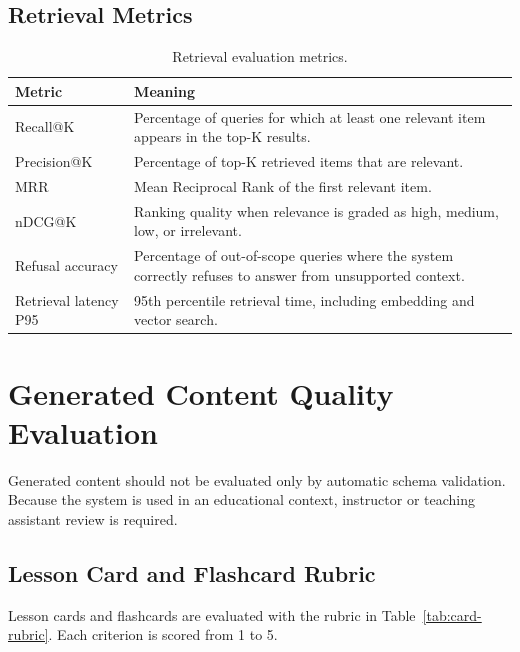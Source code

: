 \subsection{Retrieval Metrics}

\begin{table}[H]
    \centering
    \caption{Retrieval evaluation metrics.}
    \label{tab:retrieval-evaluation-metrics}
    \begin{tabular}{|p{3.0cm}|p{10.5cm}|}
        \hline
        \textbf{Metric} & \textbf{Meaning} \\
        \hline
        Recall@K
            & Percentage of queries for which at least one relevant item
              appears in the top-K results. \\
        \hline
        Precision@K
            & Percentage of top-K retrieved items that are relevant. \\
        \hline
        MRR
            & Mean Reciprocal Rank of the first relevant item. \\
        \hline
        nDCG@K
            & Ranking quality when relevance is graded as high, medium, low,
              or irrelevant. \\
        \hline
        Refusal accuracy
            & Percentage of out-of-scope queries where the system correctly
              refuses to answer from unsupported context. \\
        \hline
        Retrieval latency P95
            & 95th percentile retrieval time, including embedding and vector
              search. \\
        \hline
    \end{tabular}
\end{table}

\section{Generated Content Quality Evaluation}

Generated content should not be evaluated only by automatic schema validation.
Because the system is used in an educational context, instructor or teaching
assistant review is required.

\subsection{Lesson Card and Flashcard Rubric}

Lesson cards and flashcards are evaluated with the rubric in
Table~\ref{tab:card-rubric}. Each criterion is scored from 1 to 5.

